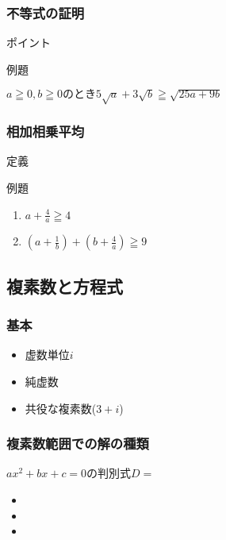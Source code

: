 \documentclass[10pt,dvipdfmx]{jsarticle}
\begin{document}
\subsubsection*{不等式の証明}
\begin{itembox}[l]{ポイント}

\end{itembox}
\begin{itembox}[l]{例題}
  \begin{large}
    $a\geqq0, b\geqq0 のとき 5\sqrt{a}+3\sqrt{b}\geqq\sqrt{25a+9b}$
    \vspace{8mm}
  \end{large}
\end{itembox}

\subsubsection*{相加相乗平均}
定義\vspace{10mm}
\begin{itembox}[l]{例題}
  \begin{enumerate}
    \item $a+\frac{4}{a}\geqq4$\vspace{10mm}
    \item $(a+\frac{1}{b})+(b+\frac{4}{a})\geqq9$\vspace{10mm}
  \end{enumerate}
\end{itembox}


\newpage
\subsection*{複素数と方程式}
\subsubsection*{基本}
\begin{large}
  \begin{itemize}
    \item 虚数単位$i$
    \item 純虚数
    \item 共役な複素数($3+i$)
  \end{itemize}
\end{large}

\subsubsection*{複素数範囲での解の種類}
$ax^2+bx+c=0$の判別式$D=$
\begin{multicols}{3}
  \begin{large}
    \begin{itemize}
      \item \item \item
    \end{itemize}
  \end{large}
\end{multicols}
\end{document}
